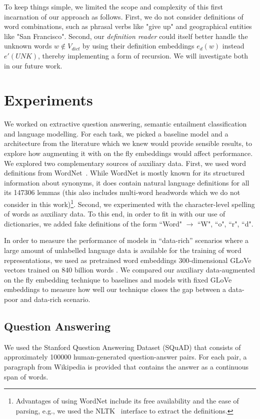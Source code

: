 To keep things simple, we limited the scope and complexity of this first incarnation of our approach as follows.
First, we do not consider definitions of word combinations, such as phrasal verbs like "give up" and geographical entities like "San Francisco". Second, our \emph{definition reader} could itself better handle the unknown words $w \notin V_{dict}$ by using their definition embeddings $e_d(w)$ instead $e'(\mathit{UNK})$, thereby implementing a form of recursion. We will investigate both in our future work.

\section{Experiments}
\label{sec:experiments}

We worked on extractive question answering, semantic entailment classification and language modelling. For each task, we picked a baseline model and a architecture from the literature which we knew would provide sensible results, to explore how augmenting it with on the fly embeddings would affect performance. We explored two complementary sources of auxiliary data. First, we used word definitions from WordNet~\citep{miller95wordnet}. While WordNet is mostly known for its structured information about synonyms, it does contain natural language definitions for all its 147306 lemmas (this also includes multi-word headwords which we do not consider in this work)\footnote{Advantages of using WordNet include its free availability and the ease of parsing, e.g., we used the NLTK~\citep{bird2006nltk} interface to extract the definitions.}. Second, we experimented with the character-level spelling of words as auxiliary data. To this end, in order to fit in with our use of dictionaries, we added fake definitions of the form ``Word" $\rightarrow$ ``W", ``o", ``r", ``d".

In order to measure the performance of models in ``data-rich'' scenarios where a large amount of unlabelled language data is available for the training of word representations, we used as pretrained word embeddings 300-dimensional GLoVe vectors trained on 840 billion words \citep{pennington2014glove}. We compared our auxiliary data-augmented on the fly embedding technique to baselines and models with fixed GLoVe embeddings to measure how well our technique closes the gap between a data-poor and data-rich scenario.

\subsection{Question Answering}
\label{sec:qa}
We used the Stanford Question Answering Dataset (SQuAD) \citep{rajpurkar2016squad} that consists of approximately 100000 human-generated question-answer pairs. For each pair, a paragraph from Wikipedia is provided that contains the answer as a continuous span of words.

